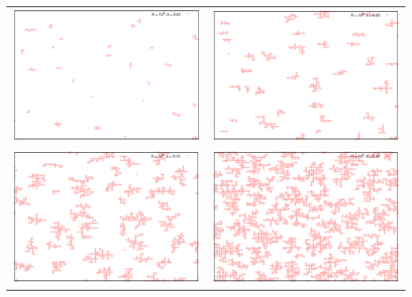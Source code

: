 \documentclass{article}
\begin{document}
\begin{textblock}{15}
\begin{center}
\begin{tabular}{cc}
\includegraphics[width=0.5\linewidth]{morph31.eps} &
\includegraphics[width=0.5\linewidth]{morph32.eps} \\
\includegraphics[width=0.5\linewidth]{morph16.eps} &
\includegraphics[width=0.5\linewidth]{morph24.eps} 
\end{tabular}
\end{center}
\end{textblock}
\end{document}
